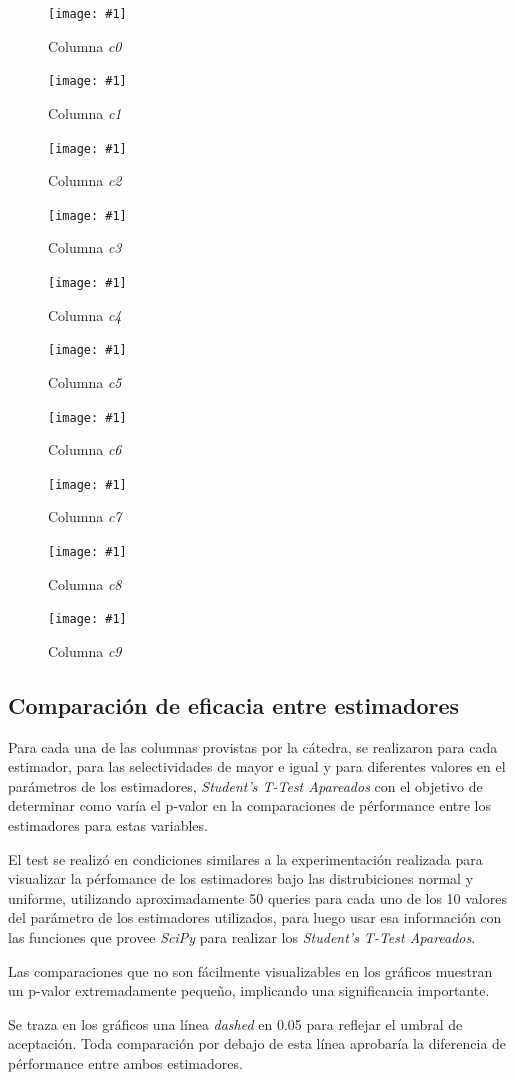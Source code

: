 \documentclass[a4paper, 10pt, twoside]{article}
\newcommand{\grafico}[3]{
  \begin{figure}[H]
    \texttt{[image: \#1]}
    \caption{#2}
    \label{#3}
  \end{figure}
}
\begin{document}
\grafico{dataset-c0}
        {Columna \emph{c0}}
        {dataset-columna-c0}

\grafico{dataset-c1}
        {Columna \emph{c1}}
        {dataset-columna-c1}

\grafico{dataset-c2}
        {Columna \emph{c2}}
        {dataset-columna-c2}

\grafico{dataset-c3}
        {Columna \emph{c3}}
        {dataset-columna-c3}

\grafico{dataset-c4}
        {Columna \emph{c4}}
        {dataset-columna-c4}

\grafico{dataset-c5}
        {Columna \emph{c5}}
        {dataset-columna-c5}

\grafico{dataset-c6}
        {Columna \emph{c6}}
        {dataset-columna-c6}

\grafico{dataset-c7}
        {Columna \emph{c7}}
        {dataset-columna-c7}

\grafico{dataset-c8}
        {Columna \emph{c8}}
        {dataset-columna-c8}

\grafico{dataset-c9}
        {Columna \emph{c9}}
        {dataset-columna-c9}


\subsection{Comparación de eficacia entre estimadores}
Para cada una de las columnas provistas por la cátedra, se realizaron para cada estimador, para las selectividades de mayor e igual y para diferentes valores en el parámetros de los estimadores, \textit{Student’s T-Test Apareados} con el objetivo de determinar como varía el p-valor en la comparaciones de pérformance entre los estimadores para estas variables.

El test se realizó en condiciones similares a la experimentación realizada para visualizar la pérfomance de los estimadores bajo las distrubiciones normal y uniforme, utilizando aproximadamente 50 queries para cada uno de los 10 valores del parámetro de los estimadores utilizados, para luego usar esa información con las funciones que provee \textit{SciPy} para realizar los \textit{Student’s T-Test Apareados}.

Las comparaciones que no son fácilmente visualizables en los gráficos muestran un p-valor extremadamente pequeño, implicando una significancia importante.

Se traza en los gráficos una línea \textit{dashed} en 0.05 para reflejar el umbral de aceptación. Toda comparación por debajo de esta línea aprobaría la diferencia de pérformance entre ambos estimadores.
\end{document}
